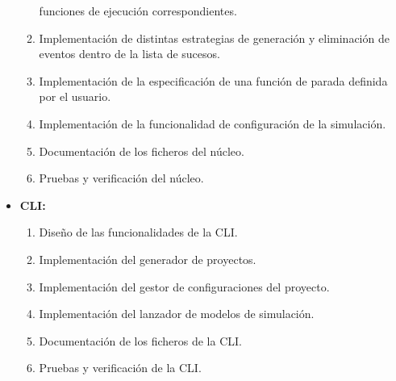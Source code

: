 \begin{itemize}
\begin{enumerate}
        funciones de ejecución correspondientes.
        \item Implementación de distintas estrategias de generación y
        eliminación de eventos dentro de la lista de sucesos.
        \item Implementación de la especificación de una función de parada
        definida por el usuario.
        \item Implementación de la funcionalidad de configuración de la simulación.
        \item Documentación de los ficheros del núcleo.
        \item Pruebas y verificación del núcleo.
    \end{enumerate}
    \item \textbf{CLI:} 
    \begin{enumerate}
        \item Diseño de las funcionalidades de la CLI.
        \item Implementación del generador de proyectos.
        \item Implementación del gestor de configuraciones del proyecto.
        \item Implementación del lanzador de modelos de simulación.
        \item Documentación de los ficheros de la CLI.
        \item Pruebas y verificación de la CLI.
    \end{enumerate}
\end{itemize}

